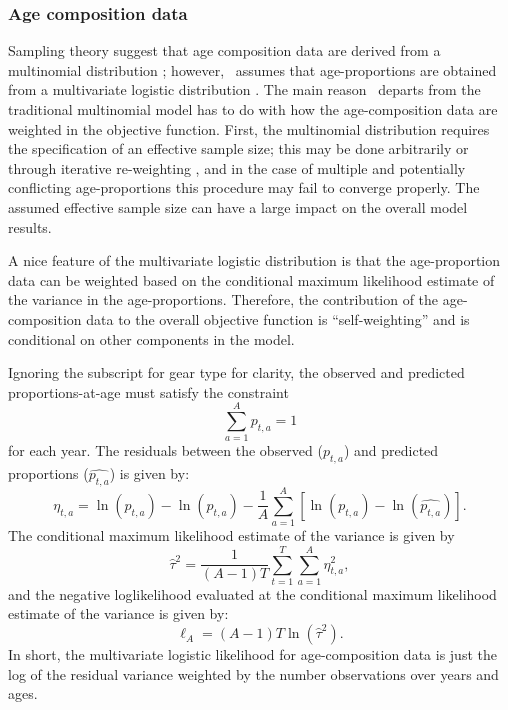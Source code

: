 \subsubsection{Age composition data}\label{agecomps}
Sampling theory suggest that age composition data are derived from a multinomial distribution \citep{fournier1982general}; however, \iscam\ assumes that age-proportions are obtained from a multivariate logistic distribution \citep{schnute1995influence,richards1997visualizing}.  The main reason \iscam\ departs from the traditional multinomial model has to do with how the age-composition data are weighted in the objective function.  First, the multinomial distribution requires the specification of an effective sample size; this may be done arbitrarily or through iterative re-weighting \citep{MCALLISTER1997,gavaris2002sif}, and in the case of multiple and potentially conflicting age-proportions this procedure may fail to converge properly.  The assumed effective sample size can have a large impact on the overall model results.  

A nice feature of the multivariate logistic distribution is that the age-proportion data can be weighted based on the conditional maximum likelihood estimate of the variance in the age-proportions.  Therefore, the contribution of the age-composition data to the overall objective function is ``self-weighting'' and is conditional on other components in the model.

Ignoring the subscript for gear type for clarity, the observed and predicted proportions-at-age must satisfy the constraint 
\[
 \sum_{a=1}^A p_{t,a} = 1
\]
for each year. The residuals between the observed ($p_{t,a}$) and predicted proportions ($\widehat{p_{t,a}}$) is given by:
\begin{equation}\label{eq7}
\eta_{t,a}=\ln(p_{t,a})-\ln(\widehat{p_{t,a}})-\frac{1}{A}\sum_{a=1}^A\left[\ln(p_{t,a})-\ln(\widehat{p_{t,a}}) \right].
\end{equation}
The conditional maximum likelihood estimate of the variance is given by
\[
\widehat{\tau}^2=\frac{1}{(A-1)T}\sum_{t=1}^T\sum_{a=1}^A \eta_{t,a}^2,
\]
and the negative loglikelihood evaluated at the conditional maximum likelihood estimate of the variance is given by:
\begin{equation}\label{eq8}
    \ell_A = (A-1)T \ln(\widehat{\tau}^2).
\end{equation}
In short, the multivariate logistic likelihood for age-composition data is just the log of the residual variance weighted by the number observations over years and ages.

